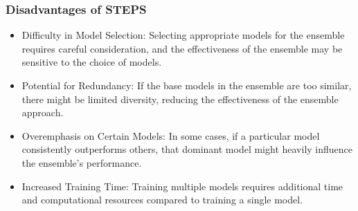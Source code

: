 \documentclass[../paper.tex]{subfiles}
\begin{document}
    \subsubsection{Disadvantages of STEPS}
        \begin{itemize}
            \item Difficulty in Model Selection:
            Selecting appropriate models for the ensemble requires careful consideration,
            and the effectiveness of the ensemble may be sensitive to the choice of models.

            \item Potential for Redundancy: If the base models in the ensemble are too similar,
            there might be limited diversity, reducing the effectiveness of the ensemble approach.

            \item Overemphasis on Certain Models:
            In some cases, if a particular model consistently outperforms others,
            that dominant model might heavily influence the ensemble's performance.

            \item Increased Training Time:
            Training multiple models requires additional time and computational resources compared to training a single model.
        \end{itemize}
\end{document}

